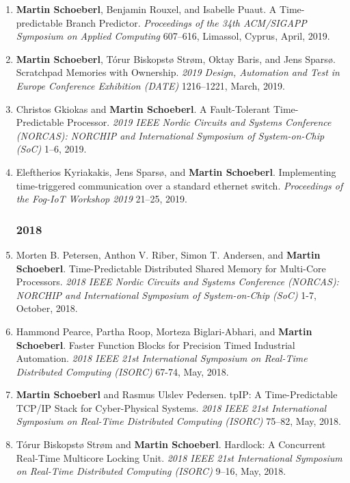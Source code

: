 \begin{enumerate}
\item {\bf Martin Schoeberl}, Benjamin Rouxel, and Isabelle Puaut.
 A Time-predictable Branch Predictor.
 \emph{Proceedings of the 34th ACM/SIGAPP Symposium on Applied Computing} 607--616, Limassol, Cyprus, April, 2019.

\item {\bf Martin Schoeberl}, T{\'o}rur Biskopst{\o} Str{\o}m, Oktay Baris, and Jens Spars{\o}.
 Scratchpad Memories with Ownership.
 \emph{2019 Design, Automation and Test in Europe Conference Exhibition (DATE)} 1216--1221, March, 2019.

\item Christos Gkiokas and {\bf Martin Schoeberl}.
 A Fault-Tolerant Time-Predictable Processor.
 \emph{2019 IEEE Nordic Circuits and Systems Conference (NORCAS): NORCHIP and International Symposium of System-on-Chip (SoC)} 1--6, 2019.

\item Eleftherios Kyriakakis, Jens Spars{\o}, and {\bf Martin Schoeberl}.
 Implementing time-triggered communication over a standard ethernet switch.
 \emph{Proceedings of the Fog-IoT Workshop 2019} 21--25, 2019.


\subsubsection*{2018}

\item Morten B. Petersen, Anthon V. Riber, Simon T. Andersen, and {\bf Martin Schoeberl}.
 Time-Predictable Distributed Shared Memory for Multi-Core Processors.
 \emph{2018 IEEE Nordic Circuits and Systems Conference (NORCAS): NORCHIP and International Symposium of System-on-Chip (SoC)} 1-7, October, 2018.

\item Hammond Pearce, Partha Roop, Morteza Biglari-Abhari, and {\bf Martin Schoeberl}.
 Faster Function Blocks for Precision Timed Industrial Automation.
 \emph{2018 IEEE 21st International Symposium on Real-Time Distributed Computing (ISORC)} 67-74, May, 2018.

\item {\bf Martin Schoeberl} and Rasmus Ulslev Pedersen.
 tpIP: A Time-Predictable TCP/IP Stack for Cyber-Physical Systems.
 \emph{2018 IEEE 21st International Symposium on Real-Time Distributed Computing (ISORC)} 75--82, May, 2018.

\item T{\'o}rur Biskopst{\o} Str{\o}m and {\bf Martin Schoeberl}.
 Hardlock: A Concurrent Real-Time Multicore Locking Unit.
 \emph{2018 IEEE 21st International Symposium on Real-Time Distributed Computing (ISORC)} 9--16, May, 2018.


\end{enumerate}
